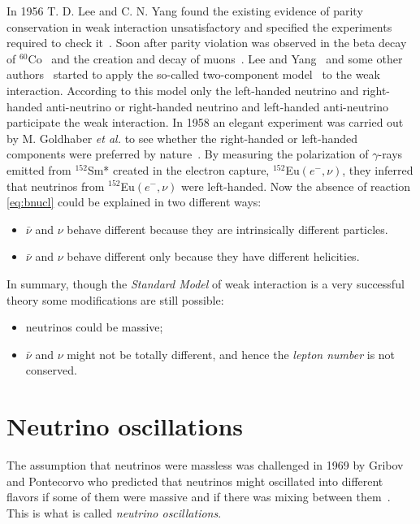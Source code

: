 In 1956 T. D. Lee and C. N. Yang found the existing evidence of parity conservation in weak interaction unsatisfactory and specified the experiments required to check it~\cite{Lee56}. Soon after parity violation was observed in the beta decay of $^{60}$Co~\cite{Wu57} and the creation and decay of muons~\cite{Gar57,Fri57}. Lee and Yang~\cite{Lee57} and some other authors~\cite{Sal57,Lan57} started to apply the so-called two-component model~\cite{Wey29} to the weak interaction. According to this model only the left-handed neutrino and right-handed anti-neutrino or right-handed neutrino and left-handed anti-neutrino participate the weak interaction. In 1958 an elegant experiment was carried out by M. Goldhaber \textit{et al.} to see whether the right-handed or left-handed components were preferred by nature~\cite{Gol58}. By measuring the polarization of $\gamma$-rays emitted from $^{152}$Sm* created in the electron capture, $^{152}$Eu$(e^-,\nu)$, they inferred that neutrinos from $^{152}$Eu$(e^-,\nu)$ were left-handed. Now the absence of reaction \ref{eq:bnucl} could be explained in two different ways:
\begin{itemize}
\item $\bar{\nu}$ and $\nu$ behave different because they are   intrinsically different particles.
\item $\bar{\nu}$ and $\nu$ behave different only because they have   different helicities.
\end{itemize}

In summary, though the \emph{Standard Model} of weak interaction is a very successful theory some modifications are still possible:
\begin{itemize}
\item neutrinos could be massive;
\item $\bar{\nu}$ and $\nu$ might not be totally different, and hence   the \emph{lepton number} is not conserved.
\end{itemize}


\section{Neutrino oscillations}
\label{sec:osci}
The assumption that neutrinos were massless was challenged in 1969 by Gribov and Pontecorvo who predicted that neutrinos might oscillated into different flavors if some of them were massive and if there was mixing between them~\cite{Gri69}. This is what is called \emph{neutrino oscillations}.

